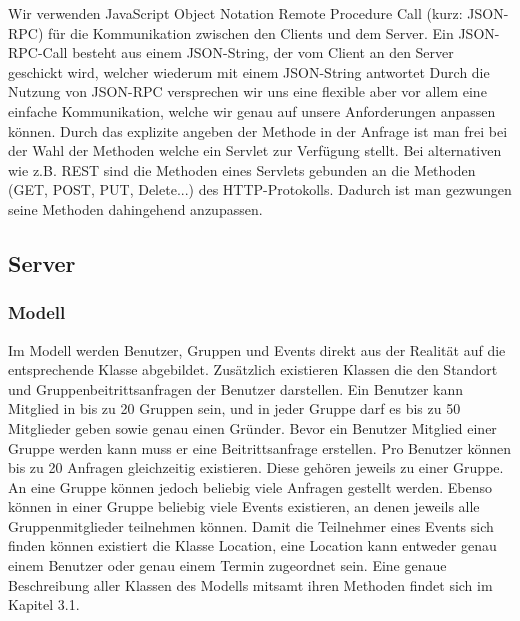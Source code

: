 	Wir verwenden JavaScript Object Notation Remote Procedure Call (kurz: JSON-RPC) für die Kommunikation zwischen den Clients und dem Server.
	Ein JSON-RPC-Call besteht aus einem JSON-String, der vom Client an den Server geschickt wird, welcher wiederum mit einem JSON-String antwortet
	Durch die Nutzung von JSON-RPC versprechen wir uns eine flexible aber vor allem eine einfache Kommunikation, welche wir genau auf unsere Anforderungen anpassen können.
Durch das explizite angeben der Methode in der Anfrage ist man frei bei der Wahl der Methoden welche ein Servlet zur Verfügung stellt. Bei alternativen wie z.B. REST sind die Methoden eines Servlets gebunden an die Methoden (GET, POST, PUT, Delete...) des HTTP-Protokolls. Dadurch ist man gezwungen seine Methoden dahingehend anzupassen.

	
	\subsection{Server}
	\subsubsection{Modell}
Im Modell werden Benutzer, Gruppen und Events direkt aus der Realität auf die entsprechende Klasse abgebildet. Zusätzlich existieren Klassen die den Standort und Gruppenbeitrittsanfragen der Benutzer darstellen.
Ein Benutzer kann Mitglied in bis zu 20 Gruppen sein, und in jeder Gruppe darf es bis zu 50 Mitglieder geben sowie genau einen Gründer. Bevor ein Benutzer Mitglied einer Gruppe werden kann muss er eine Beitrittsanfrage erstellen.
Pro Benutzer können bis zu 20 Anfragen gleichzeitig existieren. Diese gehören jeweils zu einer Gruppe.
An eine Gruppe können jedoch beliebig viele Anfragen gestellt werden.
Ebenso können in einer Gruppe beliebig viele Events existieren, an denen jeweils alle Gruppenmitglieder teilnehmen können.
Damit die Teilnehmer eines Events sich finden können existiert die Klasse Location, eine Location kann entweder genau einem Benutzer oder genau einem Termin zugeordnet sein. 
Eine genaue Beschreibung aller Klassen des Modells mitsamt ihren Methoden findet sich im Kapitel 3.1.



\begin {center}
\end {center}



